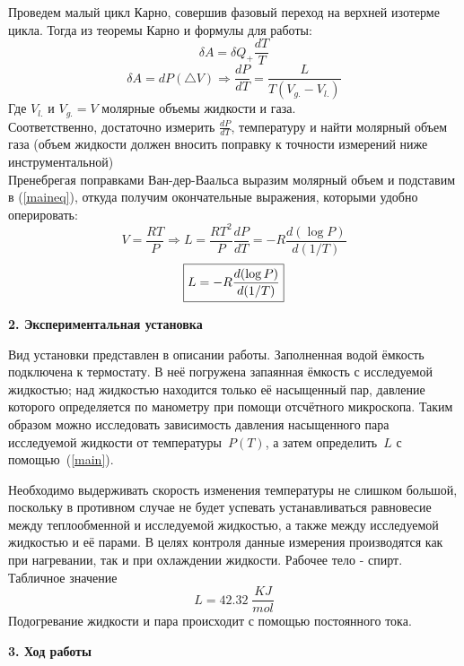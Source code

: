 \documentclass[12pt,a4paper]{article}
\begin{document}
\noindent Проведем малый цикл Карно, совершив фазовый переход на верхней изотерме цикла. Тогда из теоремы Карно и формулы для работы:
\begin{equation}
\delta A = \delta Q_{+}\frac{dT}{T}
\end{equation}
\begin{equation} \label{maineq}
\delta A = dP (\triangle V) \Rightarrow \frac{dP}{dT} = \frac{L}{T(V_{g.}-V_{l.})}
\end{equation}
Где $V_{l.}$ и $ V_{g.} = V $ молярные объемы жидкости и газа.\\
Соответственно, достаточно измерить $\frac{dP}{dT}$, температуру и  найти молярный объем газа (объем жидкости должен вносить поправку к точности измерений ниже инструментальной)\\
Пренебрегая поправками Ван-дер-Ваальса выразим молярный объем и подставим в (\ref{maineq}), откуда получим окончательные выражения, которыми удобно оперировать:
\[V = \frac{RT}{P} \Rightarrow L = \frac{RT^2}{P} \frac{dP}{dT} = - R\frac{d(\log P)}{d(1/T)}\]
\begin{equation} \label{main}
\boxed{ L =  - R\frac{d(\log P)}{d(1/T)}}  \\
\end{equation}

\newpage
\begin{Large}
\begin{center}
\textbf{2. Экспериментальная установка}\\
\end{center}
\end{Large}
Вид установки представлен в описании работы. 
Заполненная водой ёмкость подключена
к термостату. В неё погружена запаянная ёмкость с исследуемой жидкостью;
над жидкостью находится только её насыщенный пар, давление которого
определяется по манометру при помощи отсчётного микроскопа.
Таким образом можно исследовать зависимость давления насыщенного пара
исследуемой жидкости от температуры~$P(T)$, а затем определить~$L$
с помощью~(\ref{main}).

Необходимо выдерживать скорость изменения
температуры не слишком большой, поскольку в противном случае не будет успевать
устанавливаться равновесие между теплообменной и исследуемой жидкостью, а также между
исследуемой жидкостью и её парами. В целях контроля данные измерения производятся
как при нагревании, так и при охлаждении жидкости.
Рабочее тело - спирт. Табличное значение \[L = 42.32 \; \frac{KJ}{mol} \]
Подогревание жидкости и пара происходит с помощью постоянного тока.
\begin{Large}
\begin{center}
\textbf{3. Ход работы}\\
\end{center}
\end{Large}
\end{document}

